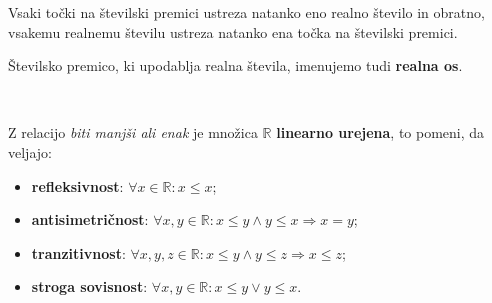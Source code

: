 \begin{figure}[H]
                    
                \end{figure}
            

            
            
                Vsaki točki na številski premici ustreza natanko eno realno število in obratno, 
                vsakemu realnemu številu ustreza natanko ena točka na številski premici.
            

            
                Številsko premico, ki upodablja realna števila, imenujemo tudi \textbf{realna os}.
            


        
                ~~        
            
                Z relacijo \textit{biti manjši ali enak} je množica $\mathbb{R}$ \textbf{linearno urejena}, 
                to pomeni, da veljajo:

                \begin{itemize}
                    \item \textbf{refleksivnost}: $\forall x\in\mathbb{R}: x\leq x$;
                    \item \textbf{antisimetričnost}: $\forall x,y\in\mathbb{R}: x\leq y \land y\leq x \Rightarrow x=y$;
                    \item \textbf{tranzitivnost}: $\forall x,y,z\in\mathbb{R}: x\leq y \land y\leq z \Rightarrow x\leq z$;
                    \item \textbf{stroga sovisnost}: $\forall x,y\in\mathbb{R}: x\leq y \lor y\leq x$.
                \end{itemize}
            

